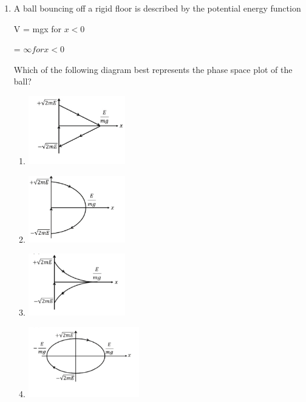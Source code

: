 \documentclass[journal,12pt,onecolumn]{IEEEtran}
\begin{document}
\begin{enumerate}[itemsep=0.45cm]
\newpage

 \item A ball bouncing off a rigid floor is described by the potential energy function

\begin{center}
    V = mgx for $x<0$
\end{center}

\begin{center}
    = $\infty for x<0$
\end{center}

Which of the following diagram best represents the phase space plot of the ball?

\hfill{}

\begin{multicols}{2}
\begin{enumerate}
    \item \includegraphics[width=0.35\textwidth]{fig9.jpeg} \hfill
    \item \includegraphics[width=0.35\textwidth]{fig10.jpeg} \hfill
    \item \includegraphics[width=0.35\textwidth]{fig11.jpeg} \hfill
    \item \includegraphics[width=0.4\textwidth]{fig12.jpeg} \hfill
\end{enumerate}
\end{multicols}


\end{enumerate}
\end{document}
